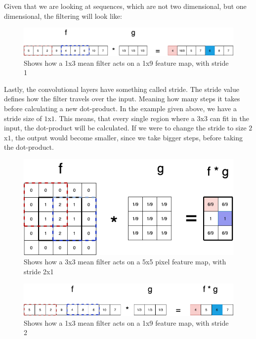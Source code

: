 \noindent
Given that we are looking at sequences, which are not two dimensional, but one dimensional, the filtering will look like:

\begin{figure}[!ht]
  \centering
  \includegraphics[scale=0.4]{latex/imgs/conv2.png}
  \caption{Shows how a 1x3 mean filter acts on a 1x9 feature map, with stride 1}\label{Baseline:before}
\end{figure}

\noindent
Lastly, the convolutional layers have something called stride. The stride value defines how the filter travels over the input. Meaning how many steps it takes before calculating a new dot-product. In the example given above, we have a stride size of $1$x$1$. This means, that every single region where a $3$x$3$ can fit in the input, the dot-product will be calculated. If we were to change the stride to size $2$x$1$, the output would become smaller, since we take bigger steps, before taking the dot-product.

\begin{figure}[!ht]
  \centering
  \includegraphics[scale=0.4]{latex/imgs/conv1_stride.png}
  \caption{Shows how a 3x3 mean filter acts on a 5x5 pixel feature map, with stride 2x1}\label{Baseline:before}
\end{figure}

\begin{figure}[!ht]
  \centering
  \includegraphics[scale=0.4]{latex/imgs/conv2_stride.png}
  \caption{Shows how a 1x3 mean filter acts on a 1x9 feature map, with stride 2}\label{Baseline:before}
\end{figure}
